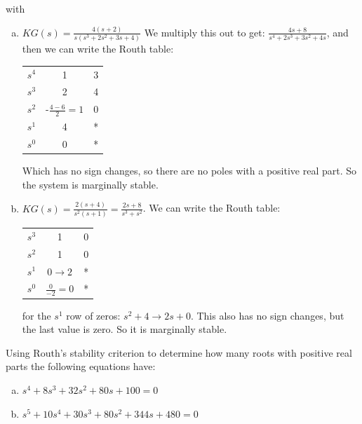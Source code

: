 \documentclass[11pt]{article}
\begin{document}
with \begin{enumerate}[a)]
    \item $KG(s) = \frac{4(s+2)}{s(s^3+2s^2+3s+4)}$
    We multiply this out to get: $\frac{4s+8}{s^4+2s^3+3s^2+4s}$, and then we can write the Routh table:
    \begin{center}
        \begin{tabular}{c|c c}
            $s^4$ & 1 & 3 \\
            $s^3$ & 2 & 4 \\
            $s^2$ & -$\frac{4-6}{2}=1$ & 0 \\
            $s^1$ & 4 & * \\
            $s^0$ & 0 & * \\
        \end{tabular}
    \end{center}
    Which has no sign changes, so there are no poles with a positive real part. So the system is marginally stable.
        
    \item $KG(s) = \frac{2(s+4)}{s^2(s+1)} = \frac{2s + 8}{s^3 + s^2}$. We can write the Routh table:
    \begin{center}
        \begin{tabular}{c|c c}
            $s^3$ & 1 & 0 \\
            $s^2$ & 1 & 0 \\
            $s^1$ & $0 \to 2$ & * \\
            $s^0$ & $\frac{0}{-2} = 0$ & * \\
        \end{tabular}
    \end{center}
    for the $s^1$ row of zeros: $s^2 + 4 \to 2s + 0$.
    This also has no sign changes, but the last value is zero. So it is marginally stable.
        
    
\end{enumerate}





Using Routh's stability criterion to determine how many roots with positive
real parts the following equations have: 

\begin{enumerate}[a)]
    \item $s^4 + 8s^3 + 32s^2 + 80s + 100 = 0$
    \item $s^5 + 10s^4 + 30s^3 + 80s^2 + 344s + 480 = 0$
\end{enumerate}
\end{document}
